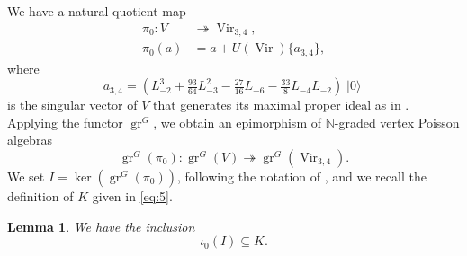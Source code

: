 \documentclass[a4paper, 12pt, reqno]{amsart}
\newtheorem{lemma}[theorem]{Lemma}
\theoremstyle{remark}
\DeclareMathOperator{\Vir}{Vir}
\DeclareMathOperator{\gr}{gr}
\DeclareMathOperator{\vac}{|0\rangle}
\begin{document}
We have a natural quotient map
\begin{align*}
  \pi_0: V &\twoheadrightarrow \Vir_{3, 4}, \\
  \pi_0(a) &= a + U(\Vir)\{a_{3, 4}\},
\end{align*}
where
\begin{equation*}
  a_{3, 4} = (L_{-2}^3 + \tfrac{93}{64}L_{-3}^2 - \tfrac{27}{16}L_{-6} - \tfrac{33}{8}L_{-4}L_{-2})\vac
\end{equation*}
is the singular vector of $V$ that generates its maximal proper ideal as in \cite{andrews_singular_2022}.
Applying the functor $\gr^G$, we obtain an epimorphism of $\mathbb{N}$-graded vertex Poisson algebras
\begin{equation*}
  \gr^G(\pi_0): \gr^G(V) \twoheadrightarrow \gr^G(\Vir_{3, 4}).
\end{equation*}
We set $I = \ker(\gr^G(\pi_0))$, following the notation of \cite{andrews_singular_2022}, and we recall the definition of $K$ given in \eqref{eq:5}.

\begin{lemma}
  \label{lmm:9}
  We have the inclusion
  \begin{equation*}
    \iota_0(I) \subseteq K.
  \end{equation*}
\end{lemma}
\end{document}
